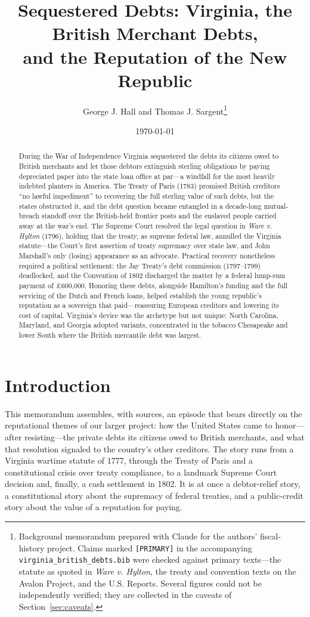 \documentclass[12pt]{article}
\title{Sequestered Debts: Virginia, the British Merchant Debts,\\
and the Reputation of the New Republic}
\author{George J. Hall and Thomas J. Sargent\thanks{Background memorandum
prepared with Claude for the authors' fiscal-history project. Claims marked
\texttt{[PRIMARY]} in the accompanying \texttt{virginia\_british\_debts.bib}
were checked against primary texts---the statute as quoted in \emph{Ware v.
Hylton}, the treaty and convention texts on the Avalon Project, and the U.S.
Reports. Several figures could not be independently verified; they are collected
in the caveats of Section~\ref{sec:caveats}.}}
\date{\today}
\begin{document}
\maketitle

\begin{abstract}
During the War of Independence Virginia sequestered the debts its citizens owed
to British merchants and let those debtors extinguish sterling obligations by
paying depreciated paper into the state loan office at par---a windfall for the
most heavily indebted planters in America. The Treaty of Paris (1783) promised
British creditors ``no lawful impediment'' to recovering the full sterling value
of such debts, but the states obstructed it, and the debt question became
entangled in a decade-long mutual-breach standoff over the British-held frontier
posts and the enslaved people carried away at the war's end. The Supreme Court
resolved the legal question in \emph{Ware v. Hylton} (1796), holding that the
treaty, as supreme federal law, annulled the Virginia statute---the Court's first
assertion of treaty supremacy over state law, and John Marshall's only (losing)
appearance as an advocate. Practical recovery nonetheless required a political
settlement: the Jay Treaty's debt commission (1797--1799) deadlocked, and the
Convention of 1802 discharged the matter by a federal lump-sum payment of
\pounds600{,}000. Honoring these debts, alongside Hamilton's funding and the full
servicing of the Dutch and French loans, helped establish the young republic's
reputation as a sovereign that paid---reassuring European creditors and lowering
its cost of capital. Virginia's device was the archetype but not unique: North
Carolina, Maryland, and Georgia adopted variants, concentrated in the tobacco
Chesapeake and lower South where the British mercantile debt was largest.
\end{abstract}

\section{Introduction}

This memorandum assembles, with sources, an episode that bears directly on the
reputational themes of our larger project: how the United States came to honor---
after resisting---the private debts its citizens owed to British merchants, and
what that resolution signaled to the country's other creditors. The story runs
from a Virginia wartime statute of 1777, through the Treaty of Paris and a
constitutional crisis over treaty compliance, to a landmark Supreme Court
decision and, finally, a cash settlement in 1802. It is at once a debtor-relief
story, a constitutional story about the supremacy of federal treaties, and a
public-credit story about the value of a reputation for paying.
\end{document}

